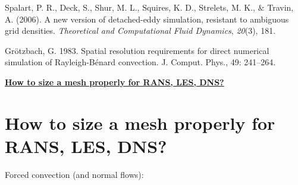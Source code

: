 \documentclass[12pt]{article}
\renewcommand{\_}{\kern-1.5pt\textunderscore\kern-1.5pt}
\begin{document}
\begin{adjustwidth}{0.33in}{0.0in}
Spalart, P. R., Deck, S., Shur, M. L., Squires, K. D., Strelets, M. K., $\&$  Travin, A. (2006). A new version of detached-eddy simulation, resistant to ambiguous grid densities. \textit{Theoretical and Computational Fluid Dynamics}, \textit{20}(3), 181.\par

\end{adjustwidth}

Grötzbach, G. 1983. Spatial resolution requirements for direct numerical simulation of Rayleigh-Bénard convection. J. Comput. Phys., 49: 241–264.\par


\vspace{\baselineskip}
\textbf{\uline{How to size a mesh properly for RANS, LES, DNS?}}\par
\part{How to size a mesh properly for RANS, LES, DNS?}
Forced convection (and normal flows):\par
\end{document}
